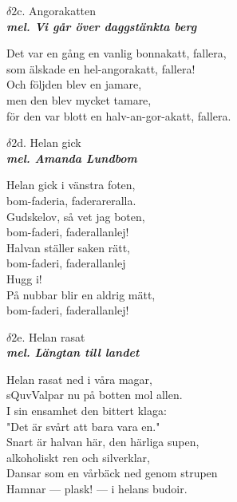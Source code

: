 \documentclass[a6paper,10pt]{article}
\newcommand{\mel}[1]{\small\textbf{\textit{mel. #1 \\}}}
\begin{document}
\newpage
\setlength{\oddsidemargin}{-0.37in}
\noindent
\begin{center}
\Large $\delta2$c. Angorakatten \\ 
\mel{Vi går över daggstänkta berg}
\end{center}
Det var en gång en vanlig bonnakatt, fallera, \\
som älskade en hel-angorakatt, fallera! \\
Och följden blev en jamare, \\
men den blev mycket tamare, \\
för den var blott en halv-an-gor-akatt, fallera. 
\begin{center}
\Large $\delta2$d. Helan gick \\ 
\mel{Amanda Lundbom}
\end{center}
Helan gick i vänstra foten, \\
bom-faderia, faderareralla. \\
Gudskelov, så vet jag boten, \\
bom-faderi, faderallanlej! \\
Halvan ställer saken rätt, \\
bom-faderi, faderallanlej \\
Hugg i! \\
På nubbar blir en aldrig mätt, \\
bom-faderi, faderallanlej! 
\begin{center}
\Large $\delta2$e. Helan rasat \\ 
\mel{Längtan till landet}
\end{center}
Helan rasat ned i våra magar, \\
sQuvValpar nu på botten mol allen. \\
I sin ensamhet den bittert klaga: \\
"Det är svårt att bara vara en." \\
Snart är halvan här, den härliga supen, \\
alkoholiskt ren och silverklar, \\
Dansar som en vårbäck ned genom strupen \\
Hamnar --- plask! --- i helans budoir. 
\end{document}

